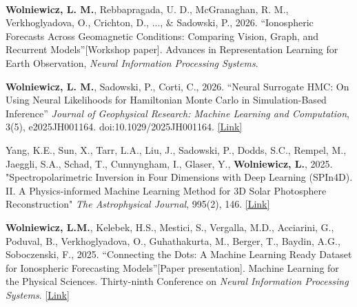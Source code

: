 
\begin{cventries}

	\cventry
	{} %
	{\ } %
	{\ } %
	{} %
{   	\vspace{-9mm}
	\begin{cvitemize2}
        \item \label{ionospheric_forecasts}
            \textbf{Wolniewicz, L. M.}, Rebbapragada, U. D., McGranaghan, R. M., Verkhoglyadova, O., Crichton, D., ..., \& Sadowski, P., 2026. ``Ionospheric Forecasts Across Geomagnetic Conditions: Comparing Vision, Graph, and Recurrent Models''[Workshop paper]. Advances in Representation Learning for Earth Observation, \textit{Neural Information Processing Systems}.
        \vspace{0.5mm}
        \item \label{neural_surrogate}
            \textbf{Wolniewicz, L. M.}, Sadowski, P., Corti, C., 2026. ``Neural Surrogate HMC: On Using Neural Likelihoods for Hamiltonian Monte Carlo in Simulation-Based Inference'' \textit{Journal of Geophysical Research: Machine Learning and Computation}, 3(5), e2025JH001164. doi:10.1029/2025JH001164. \href{https://doi.org/10.1029/2025JH001164}{\textcolor{link}{[Link]}}
        \vspace{1mm}
        \item \label{solar_inversion}
            Yang, K.E., Sun, X., Tarr, L.A., Liu, J., Sadowski, P., Dodds, S.C., Rempel, M., Jaeggli, S.A., Schad, T., Cunnyngham, I., Glaser, Y., \textbf{Wolniewicz, L.}, 2025. "Spectropolarimetric Inversion in Four Dimensions with Deep Learning (SPIn4D). II. A Physics-informed Machine Learning Method for 3D Solar Photosphere Reconstruction" \textit{The Astrophysical Journal}, 995(2), 146. \href{https://iopscience.iop.org/article/10.3847/1538-4357/ae12ef}{\textcolor{link}{[Link]}}
        \vspace{1mm}
        \item \label{ionosphere_dataset}
            \textbf{Wolniewicz, L.M.}, Kelebek, H.S., Mestici, S., Vergalla, M.D., Acciarini, G., Poduval, B., Verkhoglyadova, O., Guhathakurta, M., Berger, T., Baydin, A.G., Soboczenski, F., 2025. ``Connecting the Dots: A Machine Learning Ready Dataset for Ionospheric Forecasting Models''[Paper presentation]. Machine Learning for the Physical Sciences. Thirty-ninth Conference on \textit{Neural Information Processing Systems}. \href{https://ml4physicalsciences.github.io/2025/files/NeurIPS_ML4PS_2025_358.pdf}{\textcolor{link}{[Link]}}

\end{cvitemize2}}
\end{cventries}
